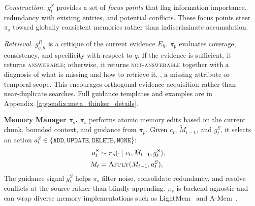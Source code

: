 

\emph{Construction.}
$g_t^{S}$ provides a set of \emph{focus points} that flag information importance, redundancy with existing entries, and potential conflicts.
These focus points steer $\pi_s$ toward globally consistent memories rather than indiscriminate accumulation.

\emph{Retrieval.}
$g_{q,h}^{R}$ is a critique of the current evidence $E_h$.
$\pi_{p}$ evaluates coverage, consistency, and specificity with respect to $q$.
If the evidence is sufficient, it returns \textsc{answerable}; otherwise, it returns \textsc{not-answerable} together with a diagnosis of what is missing and how to retrieve it, \eg, a missing attribute or temporal scope.
This encourages orthogonal evidence acquisition rather than near-duplicate searches.
Full guidance templates and examples are in Appendix~\ref{appendix:meta_thinker_details}.


\noindent\textbf{Memory Manager $\pi_{s}$.}
$\pi_{s}$ performs atomic memory edits based on the current chunk, bounded context, and guidance from $\pi_{p}$.
Given $c_t$, $\tilde{M}_{t-1}$, and $g_t^{S}$, it selects an action $a_t^{S} \in \{\texttt{ADD}, \texttt{UPDATE}, \texttt{DELETE}, \texttt{NONE}\}$:
\begin{equation}
\begin{aligned}
a_t^{S} &\sim \pi_{s}(\cdot \mid c_t,\tilde{M}_{t-1},g_t^{S}),\\
M_t &= \textsc{Apply}(M_{t-1}, a_t^{S}),
\end{aligned}
\label{eq:memory_manager}
\end{equation}
The guidance signal $g_t^{S}$ helps $\pi_{s}$ filter noise, consolidate redundancy, and resolve conflicts at the source rather than blindly appending.
$\pi_{s}$ is backend-agnostic and can wrap diverse memory implementations such as LightMem~\cite{fang2025lightmem} and A-Mem~\cite{xu2025mem}.

